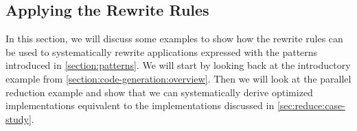 %
%

\subsection{Applying the Rewrite Rules}
\label{sec:example}
In this section, we will discuss some examples to show how the rewrite rules can be used to systematically rewrite applications expressed with the patterns introduced in \autoref{section:patterns}.
We will start by looking back at the introductory example from \autoref{section:code-generation:overview}.
Then we will look at the parallel reduction example and show that we can systematically derive optimized implementations equivalent to the implementations discussed in \autoref{sec:reduce:case-study}.

